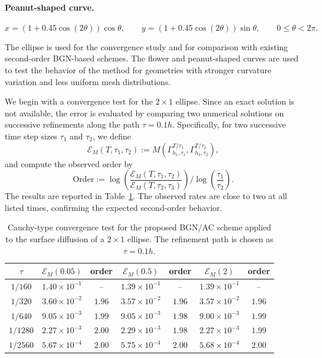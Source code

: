 \documentclass[smallextended]{svjour3}
\numberwithin{equation}{section}
\begin{document}
\paragraph{Peanut-shaped curve.}
\[
x=(1+0.45\cos(2\theta))\cos\theta,\qquad
y=(1+0.45\cos(2\theta))\sin\theta,\qquad 0\le\theta<2\pi.
\]

The ellipse is used for the convergence study and for comparison with existing second-order BGN-based schemes. The flower and peanut-shaped curves are used to test the behavior of the method for geometries with stronger curvature variation and less uniform mesh distributions.

We begin with a convergence test for the $2\times1$ ellipse. Since an exact solution is not available, the error is evaluated by comparing two numerical solutions on successive refinements along the path $\tau=0.1h$. Specifically, for two successive time step sizes $\tau_1$ and $\tau_2$, we define
\[
\mathcal{E}_{M}(T,\tau_1,\tau_2)
:=
M\!\left(\Gamma^{T/\tau_1}_{h_1,\tau_1},\Gamma^{T/\tau_2}_{h_2,\tau_2}\right),
\]
and compute the observed order by
\[
\mathrm{Order}
:=
\log\!\left(
\frac{\mathcal{E}_{M}(T,\tau_1,\tau_2)}
{\mathcal{E}_{M}(T,\tau_2,\tau_3)}
\right)
\Big/
\log\!\left(\frac{\tau_1}{\tau_2}\right).
\]
The results are reported in Table~\ref{tab:2d-convergence}. The observed rates are close to two at all listed times, confirming the expected second-order behavior.

\begin{table}[H]
	\centering
	\renewcommand{\arraystretch}{1.2}
	\caption{Cauchy-type convergence test for the proposed BGN/AC scheme applied to the surface diffusion of a $2\times1$ ellipse. The refinement path is chosen as $\tau=0.1h$.}
	\label{tab:2d-convergence}
	\begin{tabular}{c|cc|cc|cc}
		\hline
		$\tau$
		& $\mathcal{E}_{M}(0.05)$ & order
		& $\mathcal{E}_{M}(0.5)$ & order
		& $\mathcal{E}_{M}(2)$ & order\\
		\hline
		$1/160$  & $1.40\times10^{-1}$ & --   & $1.39\times10^{-1}$ & --   & $1.39\times10^{-1}$ & --   \\
		$1/320$  & $3.60\times10^{-2}$ & $1.96$ & $3.57\times10^{-2}$ & $1.96$ & $3.57\times10^{-2}$ & $1.96$ \\
		$1/640$  & $9.05\times10^{-3}$ & $1.99$ & $9.05\times10^{-3}$ & $1.98$ & $9.00\times10^{-3}$ & $1.99$ \\
		$1/1280$ & $2.27\times10^{-3}$ & $2.00$ & $2.29\times10^{-3}$ & $1.98$ & $2.27\times10^{-3}$ & $1.99$ \\
		$1/2560$ & $5.67\times10^{-4}$ & $2.00$ & $5.75\times10^{-4}$ & $2.00$ & $5.68\times10^{-4}$ & $2.00$ \\
		\hline
	\end{tabular}
\end{table}
\end{document}
